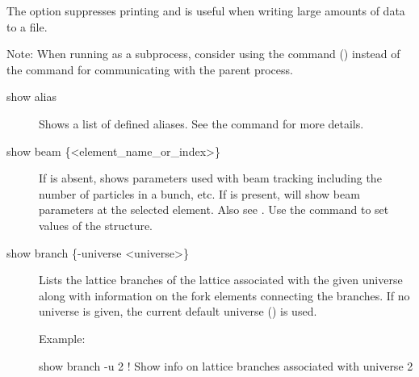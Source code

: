 {{{The  option suppresses printing and is useful when writing
large amounts of data to a file.

Note: When running \tao as a subprocess, consider using the
 command () instead of the  command
for communicating with the parent process.



\begin{description}

\item[show alias] \Newline

\vskip -0.2in

Shows a list of defined aliases. See the  command for more
details.


\item[show beam \{<element\_name\_or\_index>\}] \Newline

\vskip -0.2in

If  is absent,  shows
parameters used with beam tracking including the number of particles
in a bunch, etc.  If  is present,  will show beam parameters at the selected element. Also see
.  Use the  command to set values
of the  structure.


\item[show branch \{-universe <universe>\}] \Newline

\vskip -0.2in

Lists the lattice branches of the lattice associated with the given universe
along with information on the fork elements connecting the branches.
If no universe is given, the current default universe () is used.


Example:
\begin{example}
  show branch -u 2     ! Show info on lattice branches associated with universe 2
\end{example}



\end{description}}}}
